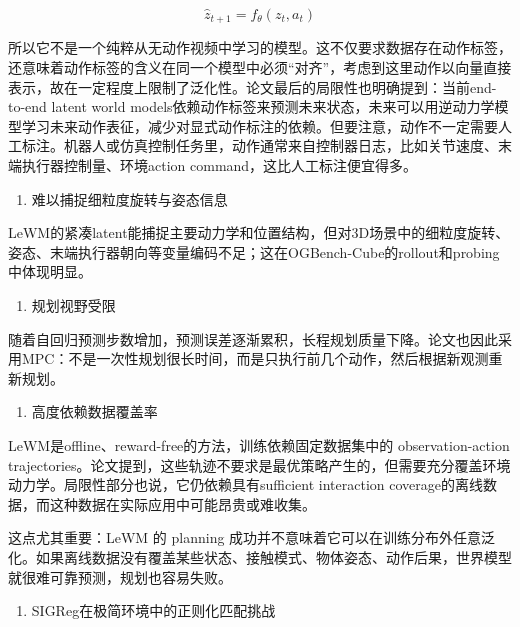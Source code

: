 \[
\hat{z}_{t+1} = f_\theta(z_t, a_t)
\]

所以它不是一个纯粹从无动作视频中学习的模型。这不仅要求数据存在动作标签，还意味着动作标签的含义在同一个模型中必须``对齐''，考虑到这里动作以向量直接表示，故在一定程度上限制了泛化性。论文最后的局限性也明确提到：当前end-to-end latent world models依赖动作标签来预测未来状态，未来可以用逆动力学模型学习未来动作表征，减少对显式动作标注的依赖。但要注意，动作不一定需要人工标注。机器人或仿真控制任务里，动作通常来自控制器日志，比如关节速度、末端执行器控制量、环境action command，这比人工标注便宜得多。

\begin{enumerate}
\def\labelenumi{\arabic{enumi}.}
\setcounter{enumi}{1}
\tightlist
\item
  难以捕捉细粒度旋转与姿态信息
\end{enumerate}

LeWM的紧凑latent能捕捉主要动力学和位置结构，但对3D场景中的细粒度旋转、姿态、末端执行器朝向等变量编码不足；这在OGBench-Cube的rollout和probing中体现明显。

\begin{enumerate}
\def\labelenumi{\arabic{enumi}.}
\setcounter{enumi}{2}
\tightlist
\item
  规划视野受限
\end{enumerate}

随着自回归预测步数增加，预测误差逐渐累积，长程规划质量下降。论文也因此采用MPC：不是一次性规划很长时间，而是只执行前几个动作，然后根据新观测重新规划。

\begin{enumerate}
\def\labelenumi{\arabic{enumi}.}
\setcounter{enumi}{3}
\tightlist
\item
  高度依赖数据覆盖率
\end{enumerate}

LeWM是offline、reward-free的方法，训练依赖固定数据集中的 observation-action trajectories。论文提到，这些轨迹不要求是最优策略产生的，但需要充分覆盖环境动力学。局限性部分也说，它仍依赖具有sufficient interaction coverage的离线数据，而这种数据在实际应用中可能昂贵或难收集。

这点尤其重要：LeWM 的 planning 成功并不意味着它可以在训练分布外任意泛化。如果离线数据没有覆盖某些状态、接触模式、物体姿态、动作后果，世界模型就很难可靠预测，规划也容易失败。

\begin{enumerate}
\def\labelenumi{\arabic{enumi}.}
\setcounter{enumi}{4}
\tightlist
\item
  SIGReg在极简环境中的正则化匹配挑战
\end{enumerate}

